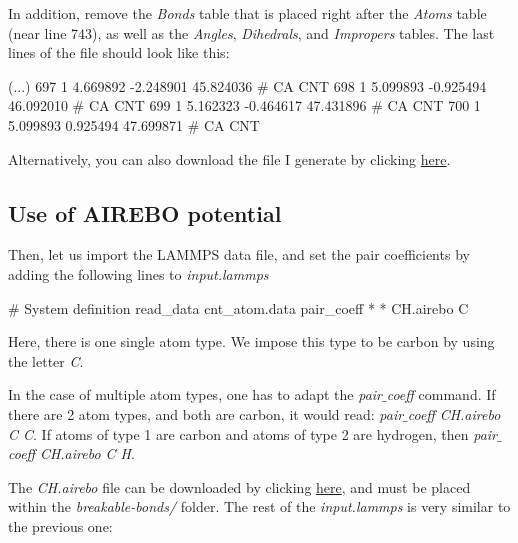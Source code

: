 \noindent In addition, remove the \textit{Bonds} table that is placed right after the 
\textit{Atoms} table (near line 743), as well as the \textit{Angles}, \textit{Dihedrals}, 
and \textit{Impropers} tables. The last lines of the file should look like this:

\begin{lcverbatim}
(...)
697 1 4.669892 -2.248901 45.824036 # CA CNT
698 1 5.099893 -0.925494 46.092010 # CA CNT
699 1 5.162323 -0.464617 47.431896 # CA CNT
700 1 5.099893 0.925494 47.699871 # CA CNT
\end{lcverbatim}

\noindent Alternatively, you can also download the file I generate 
by clicking \href{https://lammpstutorials.github.io/lammpstutorials-inputs/level1/breaking-a-carbon-nanotube/breakable-bonds/cnt_atom.data}{here}.

\subsection{Use of AIREBO potential}
\noindent Then, let us import the LAMMPS data file, and set the
pair coefficients by adding the following lines to \textit{input.lammps}

\begin{lcverbatim}
# System definition
read_data cnt_atom.data
pair_coeff * * CH.airebo C
\end{lcverbatim}

\noindent Here, there is one single atom type. We impose this type
to be carbon by using the letter \textit{C}.

\begin{tcolorbox}[colback=mylightblue!5!white,colframe=mylightblue!75!black,title=Setting AIREBO pair coefficients]

\vspace{0.25cm} \noindent In the case of multiple atom types, one has to adapt the \textit{pair$\_$coeff} command. 
If there are 2 atom types, and both are carbon, it would read: \textit{pair$\_$coeff } \textit{ CH.airebo C C}.
If atoms of type 1 are carbon and atoms of type 2 are hydrogen, then \textit{pair$\_$coeff } \textit{ CH.airebo C H}.        
\end{tcolorbox}

\noindent The \textit{CH.airebo} file can be
downloaded by clicking \href{https://lammpstutorials.github.io/lammpstutorials-inputs/level1/breaking-a-carbon-nanotube/breakable-bonds/CH.airebo}{here},
and must be placed within the \textit{breakable-bonds/} folder.
The rest of the \textit{input.lammps} is very similar to the previous one:


